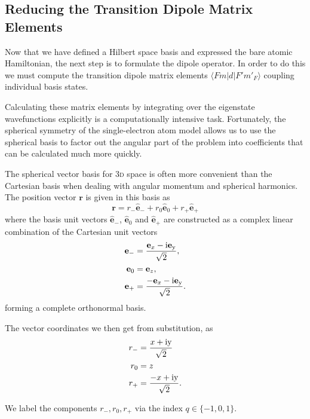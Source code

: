   \subsection{Reducing the Transition Dipole Matrix Elements}

    Now that we have defined a Hilbert space basis and expressed the bare atomic
    Hamiltonian, the next step is to formulate the dipole operator. In order to
    do this we must compute the transition dipole matrix elements
    $\langle F m | d | F' m'_F \rangle$ coupling individual
    basis states.

    Calculating these matrix elements by integrating over the eigenstate
    wavefunctions explicitly is a computationally intensive task. Fortunately,
    the spherical symmetry of the single-electron atom model allows us to use
    the spherical basis to factor out the angular part of the problem into
    coefficients that can be calculated much more quickly.

    The spherical vector basis for \textsc{3d} space is often more convenient
    than the Cartesian basis when dealing with angular momentum and spherical
    harmonics. The position vector $\mathbf{r}$ is given in this basis as
    \begin{equation}
      \mathbf{r} = r_- \hat{\mathbf{e}}_- + r_0 \hat{\mathbf{e}}_0 + 
        r_+ \hat{\mathbf{e}}_+
    \end{equation}
    where the basis unit vectors $\hat{\mathbf{e}}_-$, $\hat{\mathbf{e}}_0$ and
    $\hat{\mathbf{e}}_+$ are constructed as a complex linear combination of the
    Cartesian unit vectors
    \begin{align}
      \mathbf{e}_- &= \frac{\mathbf{e}_x - \rm{i} \mathbf{e}_y }{\sqrt{2}}, \\
      \mathbf{e}_0 &= \mathbf{e}_z, \\
      \mathbf{e}_+ &= \frac{-\mathbf{e}_x - \rm{i} \mathbf{e}_y }{\sqrt{2}}.
    \end{align}
    forming a complete orthonormal basis.

    The vector coordinates we then get from substitution, as
    \begin{align}
      r_- &= \frac{x + \rm{i} y }{\sqrt{2}} \\
      r_0 &= z \\
      r_+ &= \frac{-x + \rm{i} y }{\sqrt{2}}.
    \end{align}

    We label the components $r_-, r_0, r_+$ via the index $q \in \{ -1, 0, 1\}$.


